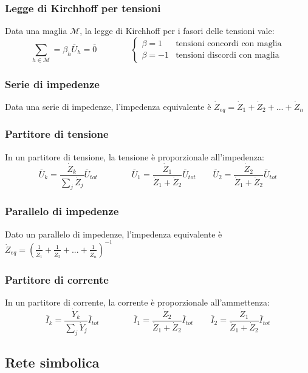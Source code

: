\documentclass[a4paper]{article}
\begin{document}
\subsubsection*{Legge di Kirchhoff per tensioni}
Data una maglia \(\mathcal{M}\), la legge di Kirchhoff per i fasori delle tensioni vale:
\[\sum_{h \in \mathcal{M}} = \beta_h \overline{U}_h = \overline{0} \qquad \qquad \begin{cases}\beta = 1 &\text{tensioni concordi con maglia} \\ \beta = -1 &\text{tensioni discordi con maglia}\end{cases}\]

\subsubsection*{Serie di impedenze}
Data una serie di impedenze, l'impedenza equivalente è \(\dot{Z}_{eq} = \dot{Z}_1 + \dot{Z}_2 + ... + \dot{Z}_n\)

\subsubsection*{Partitore di tensione}
In un partitore di tensione, la tensione è proporzionale all'impedenza:
\[\overline{U}_k = \frac{\dot{Z}_k}{\sum_j \dot{Z}_j} \overline{U}_{tot} \qquad\qquad \overline{U}_1 = \frac{\dot{Z}_1}{\dot{Z}_1 + \dot{Z}_2} \overline{U}_{tot} \qquad \overline{U}_2 = \frac{\dot{Z}_2}{\dot{Z}_1 + \dot{Z}_2} \overline{U}_{tot}\]

\subsubsection*{Parallelo di impedenze}
Dato un parallelo di impedenze, l'impedenza equivalente è \(\dot{Z}_{eq} = \left(\frac{1}{\dot{Z}_1} + \frac{1}{\dot{Z}_2} + ... + \frac{1}{\dot{Z}_n}\right)^{-1}\)

\subsubsection*{Partitore di corrente}
In un partitore di corrente, la corrente è proporzionale all'ammettenza:
\[\overline{I}_k = \frac{\dot{Y}_k}{\sum_j \dot{Y}_j} \overline{I}_{tot} \qquad\qquad \overline{I}_1 = \frac{\dot{Z}_2}{\dot{Z}_1 + \dot{Z}_2} \overline{I}_{tot} \qquad \overline{I}_2 = \frac{\dot{Z}_1}{\dot{Z}_1 + \dot{Z}_2} \overline{I}_{tot}\]

\subsection{Rete simbolica}
\end{document}
